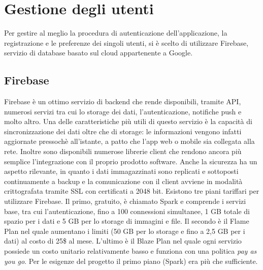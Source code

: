 \chapter{Gestione degli utenti}
Per gestire al meglio la procedura di autenticazione dell'applicazione, la
registrazione e le preferenze dei singoli utenti, si è scelto di utilizzare
Firebase, servizio di database basato sul cloud appartenente a Google.

\section{Firebase}
Firebase è un ottimo servizio di backend che rende disponibili, tramite API,
numerosi servizi tra cui lo storage dei dati, l'autenticazione, notifiche push e
molto altro. Una delle caratteristiche più utili di questo servizio è la
capacità di sincronizzazione dei dati oltre che di storage: le informazioni
vengono infatti aggiornate pressochè all'istante, a patto che l'app web o mobile
sia collegata alla rete. Inoltre sono disponibili numerose librerie client che
rendono ancora più semplice l'integrazione con il proprio prodotto software.
Anche la sicurezza ha un aspetto rilevante, in quanto i dati immagazzinati sono
replicati e sottoposti continuamente a backup e la comunicazione con il client
avviene in modalità crittografata tramite SSL con certificati a 2048 bit.
Esistono tre piani tariffari per utilizzare Firebase. Il primo, gratuito, è
chiamato Spark e comprende i servizi base, tra cui l'autenticazione, fino a 100
connessioni simultanee, 1 GB totale di spazio per i dati e 5 GB per lo storage
di immagini e file. Il secondo è il Flame Plan nel quale aumentano i limiti (50
GB per lo storage e fino a 2,5 GB per i dati) al costo di 25\$ al mese.
L'ultimo è il Blaze Plan nel quale ogni servizio possiede un costo unitario
relativamente basso e funziona con una politica \textit{pay as you go}. Per le
esigenze del progetto il primo piano (Spark) era più che sufficiente.

